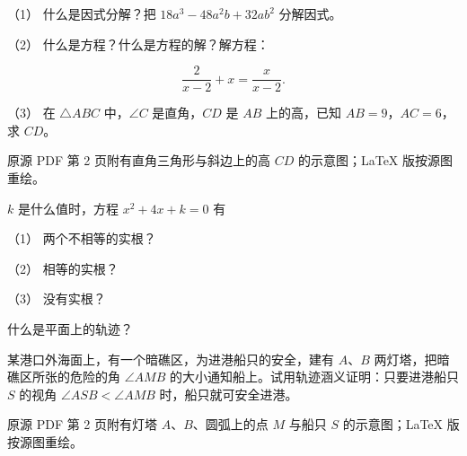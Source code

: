 \Needspace{0.4\textheight}
\begin{question}

（1） 什么是因式分解？把 $18a^3-48a^2b+32ab^2$ 分解因式。

（2） 什么是方程？什么是方程的解？解方程：

\nopagebreak[4]
\[
\frac{2}{x-2}+x=\frac{x}{x-2}.
\]

（3） 在 $\triangle ABC$ 中，$\angle C$ 是直角，$CD$ 是 $AB$ 上的高，已知 $AB=9$，$AC=6$，求 $CD$。

\begin{gktip}
原源 PDF 第 2 页附有直角三角形与斜边上的高 $CD$ 的示意图；LaTeX 版按源图重绘。
\end{gktip}
\nopagebreak[4]
\begin{center}\end{center}
\nopagebreak[4]
\end{question}
\begin{question}
$k$ 是什么值时，方程 $x^2+4x+k=0$ 有

（1） 两个不相等的实根？

（2） 相等的实根？

（3） 没有实根？

\Needspace{0.4\textheight}
\end{question}
\begin{question}
什么是平面上的轨迹？

某港口外海面上，有一个暗礁区，为进港船只的安全，建有 $A\text{、}B$ 两灯塔，把暗礁区所张的危险的角 $\angle AMB$ 的大小通知船上。试用轨迹涵义证明：只要进港船只 $S$ 的视角 $\angle ASB<\angle AMB$ 时，船只就可安全进港。

\begin{gktip}
原源 PDF 第 2 页附有灯塔 $A\text{、}B$、圆弧上的点 $M$ 与船只 $S$ 的示意图；LaTeX 版按源图重绘。
\end{gktip}
\nopagebreak[4]
\begin{center}\end{center}
\nopagebreak[4]
\end{question}
